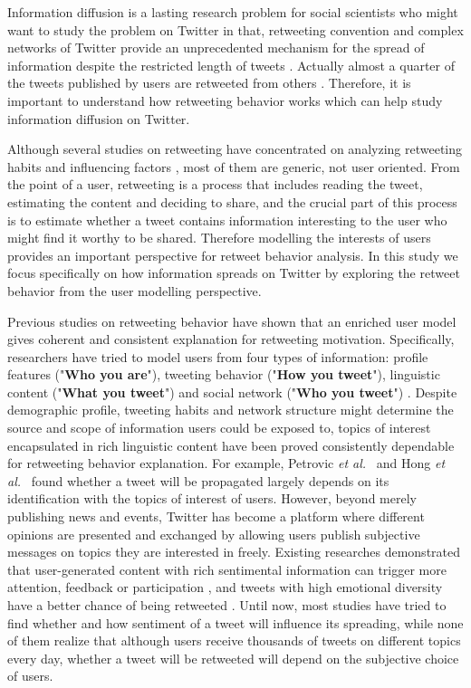 \documentclass[smallcondensed]{svjour3}     %
\begin{document}
Information diffusion is a lasting research problem for social scientists who might want to study the problem on Twitter in that, retweeting convention and complex networks of Twitter provide an unprecedented mechanism for the spread of information despite the restricted length of tweets \cite{Jenders:2013APV}. 
Actually almost a quarter of the tweets published by users are retweeted from others \cite{conf/cikm/YangGCTLZS10}. 
Therefore, it is important to understand how retweeting behavior works which can help study information diffusion on Twitter. 

Although several studies on retweeting have concentrated on analyzing retweeting habits and influencing factors \cite{Boyd2010,Kwak:2010TSN,Suh2010}, most of them are generic, not user oriented.
From the point of a user, retweeting is a process that includes reading the tweet, estimating the content and deciding to share, and the crucial part of this process is to estimate whether a tweet contains information interesting to the user who might find it worthy to be shared.
Therefore modelling the interests of users provides an important perspective for retweet behavior analysis. 
In this study we focus specifically on how information spreads on Twitter by exploring the retweet behavior from the user modelling perspective.

Previous studies on retweeting behavior have shown that an enriched user model gives coherent and consistent explanation for retweeting motivation\cite{Abel:2011AUM,conf/icwsm/MacskassyM11,conf/wsdm/FengW13}. 
Specifically, researchers have tried to model users from four types of information:
profile features ("\textbf{Who you are}"), tweeting behavior ("\textbf{How you tweet}"), linguistic content ("\textbf{What you tweet}") and social network ("\textbf{Who you tweet}") \cite{Pennacchiotti:icwsm11}. 
Despite demographic profile, tweeting habits and network structure might determine the source and scope of information users could be exposed to, topics of interest encapsulated in rich linguistic content have been proved consistently dependable for retweeting behavior explanation. 
For example, Petrovic \emph{et al.}~\cite{Osborne_Lavrenko_2011} and Hong \emph{et al.}~\cite{ericmedvet:hong2011} found whether a tweet will be propagated largely depends on its identification with the topics of interest of users. 
However, beyond merely publishing news and events, Twitter has become a platform where different opinions are presented and exchanged by allowing users publish subjective messages on topics they are interested in freely. 
Existing researches demonstrated that user-generated content with rich sentimental information can trigger more attention, feedback or participation \cite{DBLP:conf/hicss/StieglitzD12}, and tweets with high emotional diversity have a better chance of being retweeted \cite{conf/icwsm/PfitznerGS12}.
Until now, most studies have tried to find whether and how sentiment of a tweet will influence its spreading, while none of them realize that although users receive thousands of tweets on different topics every day, whether a tweet will be retweeted will depend on the subjective choice of users. 
\end{document}
